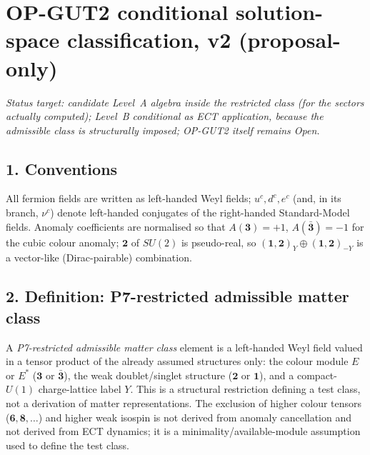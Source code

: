 \section*{OP-GUT2 conditional solution-space classification, v2
(proposal-only)}

\textit{Status target: candidate Level~A algebra inside the
restricted class (for the sectors actually computed); Level~B
conditional as ECT application, because the admissible class is
structurally imposed; OP-GUT2 itself remains Open.}

\subsection*{1. Conventions}
All fermion fields are written as left-handed Weyl fields;
$u^c,d^c,e^c$ (and, in its branch, $\nu^c$) denote left-handed
conjugates of the right-handed Standard-Model fields.
Anomaly coefficients are normalised so that
$A(\mathbf 3)=+1$, $A(\bar{\mathbf 3})=-1$ for the cubic colour
anomaly; $\mathbf 2$ of $SU(2)$ is pseudo-real, so
$(\mathbf 1,\mathbf 2)_Y\oplus(\mathbf 1,\mathbf 2)_{-Y}$ is a
vector-like (Dirac-pairable) combination.

\subsection*{2. Definition: P7-restricted admissible matter class}
A \emph{P7-restricted admissible matter class} element is a
left-handed Weyl field valued in a tensor product of the already
assumed structures only: the colour module $E$ or $E^*$
($\mathbf 3$ or $\bar{\mathbf 3}$), the weak doublet/singlet
structure ($\mathbf 2$ or $\mathbf 1$), and a compact-$U(1)$
charge-lattice label $Y$.
This is a structural restriction defining a test class, not a
derivation of matter representations.
The exclusion of higher colour tensors
($\mathbf 6,\mathbf 8,\dots$) and higher weak isospin is not
derived from anomaly cancellation and not derived from ECT
dynamics; it is a minimality/available-module assumption used to
define the test class.


